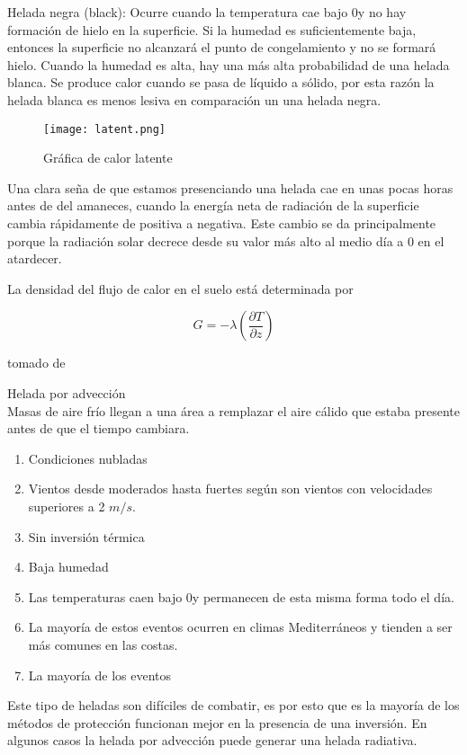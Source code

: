 Helada negra (black): Ocurre cuando la temperatura cae bajo 0\celc y no hay formación de hielo en la superficie. Si la humedad es suficientemente baja, entonces la superficie no alcanzará el punto de congelamiento y no se formará hielo. Cuando la humedad es alta, hay una más alta probabilidad de una helada blanca. Se produce calor cuando se pasa de líquido a sólido, por esta razón la helada blanca es menos lesiva en comparación un una helada negra.

\begin{figure}[H]
	\begin{center}
	\texttt{[image: latent.png]}
		\caption{Gráfica de calor latente}
		\label{subfig:cal_lat}	
	\end{center}

\end{figure}

Una clara seña de que estamos presenciando una helada cae en unas pocas horas antes de del amaneces, cuando la energía neta de radiación de la superficie cambia rápidamente de positiva a negativa. Este cambio se da principalmente porque la radiación solar decrece desde su valor más alto al medio día a 0 en el atardecer.

La densidad del flujo de calor en el suelo está determinada por 

\begin{equation}\label{eq:frost_index}
    G = -\lambda(\frac{\partial T}{\partial z})
\end{equation}

tomado de \citep{sauer2002soil}

Helada por advección\\
Masas de aire frío llegan a una área a remplazar el aire cálido que estaba presente antes de que el tiempo cambiara.

\begin{enumerate}
\item Condiciones nubladas
\item Vientos desde moderados hasta fuertes según \citet{prabha2008evaluation} son vientos con velocidades superiores a 2 $m/s$.
\item Sin inversión térmica
\item Baja humedad
\item Las temperaturas caen bajo 0\celc y permanecen de esta misma forma todo el día.
\item La mayoría de estos eventos ocurren en climas Mediterráneos y tienden a ser más comunes en las costas.
\item La mayoría de los eventos
\end{enumerate}
Este tipo de heladas son difíciles de combatir, es por esto que es la mayoría de los métodos de protección funcionan mejor en la presencia de una inversión. En algunos casos la helada por advección puede generar una helada radiativa.\\

